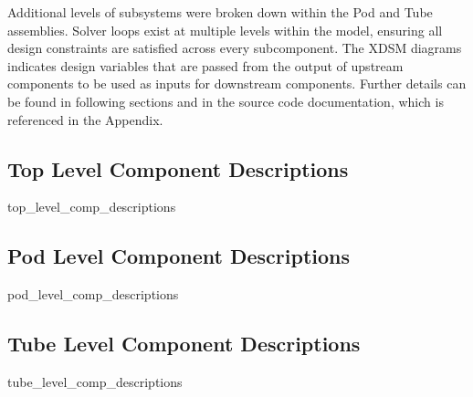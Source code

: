 Additional levels of subsystems were broken down within the Pod and Tube assemblies.
Solver loops exist at multiple levels within the model, ensuring all design
constraints are satisfied across every subcomponent.
The XDSM diagrams indicates design variables that are passed from the output of
upstream components to be used as inputs for downstream components.
Further details can be found in following sections and in the source code
documentation, which is referenced in the Appendix.

\subsection{Top Level Component Descriptions}
	{top_level_comp_descriptions}
\subsection{Pod Level Component Descriptions}
	{pod_level_comp_descriptions}
\subsection{Tube Level Component Descriptions}
	{tube_level_comp_descriptions}


